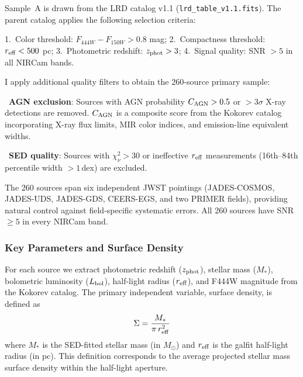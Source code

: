 \documentclass[apj,twocolumn,longbibliography,linenumbers]{aastex701}
\begin{document}
Sample~A is drawn from the \citealt{Kokorev2024} LRD catalog v1.1 (\texttt{lrd\_table\_v1.1.fits}). The parent catalog applies the following selection criteria:

1.~Color threshold: $F_{444W} - F_{150W} > 0.8$ mag;
2.~Compactness threshold: $r_{\rm eff} < 500$ pc;
3.~Photometric redshift: $z_{\rm phot} > 3$;
4.~Signal quality: SNR $> 5$ in all NIRCam bands.

I apply additional quality filters to obtain the 260-source primary sample:

\textbullet~\textbf{AGN exclusion}: Sources with AGN probability $C_{\rm AGN} > 0.5$ or $>3\sigma$ X-ray detections are removed. $C_{\rm AGN}$ is a composite score from the Kokorev catalog incorporating X-ray flux limits, MIR color indices, and emission-line equivalent widths.

\textbullet~\textbf{SED quality}: Sources with $\chi^2_\nu > 30$ or ineffective $r_{\rm eff}$ measurements (16th--84th percentile width $> 1$\,dex) are excluded.

The 260 sources span six independent JWST pointings (JADES-COSMOS, JADES-UDS, JADES-GDS, CEERS-EGS, and two PRIMER fields), providing natural control against field-specific systematic errors. All 260 sources have SNR $\geq 5$ in every NIRCam band.

\subsubsection{Key Parameters and Surface Density}

For each source we extract photometric redshift ($z_{\rm phot}$), stellar mass ($M_*$), bolometric luminosity ($L_{\rm bol}$), half-light radius ($r_{\rm eff}$), and F444W magnitude from the Kokorev catalog. The primary independent variable, surface density, is defined as
\begin{equation}
\Sigma = \frac{M_*}{\pi\, r_{\rm eff}^2}
\label{eq:Sigma_def}
\end{equation}
where $M_*$ is the SED-fitted stellar mass (in $M_\odot$) and $r_{\rm eff}$ is the \citealt{Peng2010} galfit half-light radius (in pc). This definition corresponds to the average projected stellar mass surface density within the half-light aperture.
\end{document}

